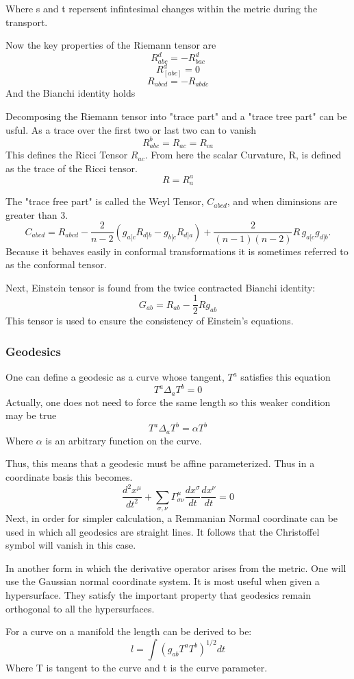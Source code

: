 Where s and t repersent infintesimal changes within the metric during the transport.

Now the key properties of the Riemann tensor are
\[
R_{abc}^d = - R_{bac}^d
\]
\[
R_{[abc]}^d = 0
\]
\[
R_{abcd}=-R_{abdc}
\]
And the Bianchi identity holds

Decomposing the Riemann tensor into "trace part" and a "trace tree part" can be usful. As a trace over the first two or last two can to vanish
\[
R_{abc}^b=R_{ac}=R_{ca}
  \]
  This defines the Ricci Tensor $R_{ac}$. From here the scalar Curvature, R, is defined as the trace of the Ricci tensor.
\[
R=R_a^a
\]

The "trace free part" is called the Weyl Tensor, $C_{abcd}$, and when diminsions are greater than 3.
\[
    C_{abcd}
= R_{abcd}
- \frac{2}{n-2}\left(g_{a[c}R_{d]b} - g_{b[c}R_{d]a}\right)
+ \frac{2}{(n-1)(n-2)}R\, g_{a[c}g_{d]b}.
  \]
  Because it behaves easily in conformal transformations it is sometimes referred to as the conformal tensor.

  Next, Einstein tensor is found from the twice contracted Bianchi identity:
\[
G_{ab}=R_{ab}- \frac{1}{2}R g_{ab}
  \]
  This tensor is used to ensure the consistency of Einstein's equations.

\subsubsection{Geodesics}
One can define a geodesic as a curve whose tangent, $T^a$ satisfies this equation
\[
T^a \Delta_a T^b = 0
  \]
  Actually, one does not need to force the same length so this weaker condition may be true
\[
T^a \Delta_a T^b = \alpha T^b
  \]
  Where $\alpha$ is an arbitrary function on the curve.

Thus, this means that a geodesic must be affine parameterized. Thus in a coordinate basis this becomes.
\[
\frac{d^2 x^\mu}{dt^2}+ \sum_{\sigma, \nu} \Gamma^\mu_{\sigma \nu} \frac{dx^\sigma}{dt} \frac{dx^\nu}{dt}=0
  \]
  Next, in order for simpler calculation, a Remmanian Normal coordinate can be used in which all geodesics are straight lines. It follows that the Christoffel symbol will vanish in this case.

  In another form in which the derivative operator arises from the metric. One will use the Gaussian normal coordinate system. It is most useful when given a hypersurface. They satisfy the important property that geodesics remain orthogonal to all the hypersurfaces.

  For a curve on a manifold the length can be derived to be:
  \[
l = \int (g_{ab}T^a T^b)^{1/2}dt
\]
Where T is tangent to the curve and t is the curve parameter.

